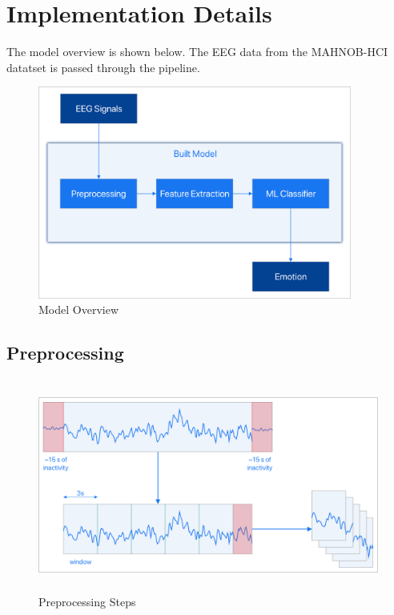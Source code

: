 
\chapter{Implementation Details} %

\label{Chapter5} %


The model overview is shown below. The EEG data from the MAHNOB-HCI datatset is passed through the pipeline.

\begin{figure}[H]
\centering
\includegraphics[height=7cm]{Figures/built_model.png}
\caption{Model Overview}
\label{fig22}
\end{figure}

\section{Preprocessing}

\begin{figure}[H]
\centering
\includegraphics[height=7cm]{Figures/preprocess.png}
\caption{Preprocessing Steps}
\label{fig23}
\end{figure}

